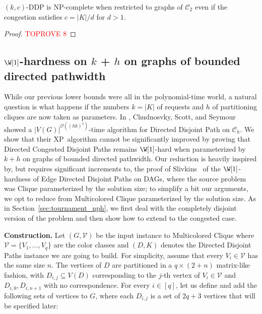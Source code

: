 \documentclass[a4paper,UKenglish,cleveref, autoref, thm-restate]{lipics-v2021}
\renewcommand{\NP}{{\sf NP}\xspace}
\renewcommand{\XP}{{\sf XP}\xspace}
\newcommand{\pname}[1]{{\sc #1}}
\newcommand{\bigO}[1]{\mathcal{O}\!\left(#1\right)}
\newcommand{\congestion}{c}
\begin{document}
\begin{theorem}
  \label{thm:c2_hardness_all_ratio}
  \pname{$(k,c)$-DDP} is \NP-complete when restricted to graphs of
  $\mathcal{C}_2$ even if the congestion satisfies $\congestion = |K|/d$ for $d > 1$.
\end{theorem}

\begin{proof}\textcolor{red}{TOPROVE 8}\end{proof}

\subsection{$\W[1]$-hardness on $k$ + $h$ on graphs of bounded directed pathwidth}
While our previous lower bounds were all in the polynomial-time world, a natural question
is what happens if the numbers $k = |K|$ of requests and $h$ of partitioning cliques are
now taken as parameters.
In \cite{chudnovsky_union_of_tournaments}, Chudnosvky, Scott, and Seymour showed a
$|V(G)|^{\bigO{(hk)^5}}$-time algorithm for \pname{Directed Disjoint Path} on
$\mathcal{C}_h$.
We show that their \XP\ algorithm cannot be significantly improved by proving that \pname{Directed
Congested Disjoint Paths} remains $\W[1]$-hard when parameterized by $k + h$ on graphs of
bounded directed pathwidth.
Our reduction is heavily inspired by, but requires significant increments to, the proof
of Slivkins~\cite{Slivkins2010} of the
$\W[1]$-hardness of \pname{Edge Directed Disjoint Paths} on DAGs, where the source
problem was \pname{Clique} parameterized by the solution size; to simplify a bit our
arguments, we opt to reduce from \pname{Multicolored Clique} parameterized by the solution size.
As in Section~\ref{sec:tournament_nph}, we first deal with the completely disjoint
version of the problem and then show how to extend to the congested case.

\noindent\textbf{Construction.} Let $(G, \mathcal{V})$ be the input instance to
\pname{Multicolored Clique} where $\mathcal{V} = \{V_1, \dots, V_q\}$ are the color
classes and $(D, K)$ denotes the \pname{Directed Disjoint Paths} instance we are going to build.
For simplicity, assume that every $V_i \in \mathcal{V}$ has the same size $n$.
The vertices of $D$ are partitioned in a $q \times (2 + n)$ matrix-like
fashion, with $D_{i,j} \subseteq V(D)$ corresponding to the $j$-th vertex of $V_i \in
\mathcal{V}$ and $D_{i,0}, D_{i, n+1}$ with no correspondence.
For every $i \in [q]$, let us define and add the following sets of vertices to $G$, where
each $D_{i,j}$ is a set of $2q + 3$ vertices that will be specified later:
\end{document}
